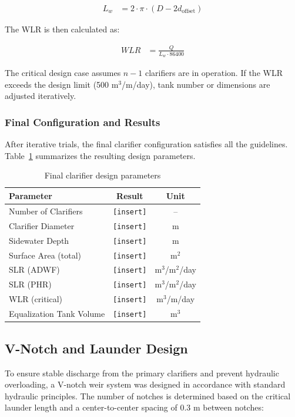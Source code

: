 \documentclass[12pt]{article}
\begin{document}
\begin{align}
L_w &= 2 \cdot \pi \cdot (D - 2d_{\text{offset}})
\end{align}

The WLR is then calculated as:

\begin{align}
WLR &= \frac{Q}{L_w \cdot 86400}
\end{align}

The critical design case assumes \(n-1\) clarifiers are in operation. If the WLR exceeds the design limit (500 m$^3$/m/day), tank number or dimensions are adjusted iteratively.

\subsubsection{Final Configuration and Results}

After iterative trials, the final clarifier configuration satisfies all the guidelines. Table~\ref{tab:clarifier_results} summarizes the resulting design parameters.

\begin{table}[h]
\centering
\caption{Final clarifier design parameters}
\label{tab:clarifier_results}
\begin{tabular}{|l|c|c|}
\hline
\textbf{Parameter} & \textbf{Result} & \textbf{Unit} \\
\hline
Number of Clarifiers & \texttt{[insert]} & -- \\
Clarifier Diameter & \texttt{[insert]} & m \\
Sidewater Depth & \texttt{[insert]} & m \\
Surface Area (total) & \texttt{[insert]} & m$^2$ \\
SLR (ADWF) & \texttt{[insert]} & m$^3$/m$^2$/day \\
SLR (PHR) & \texttt{[insert]} & m$^3$/m$^2$/day \\
WLR (critical) & \texttt{[insert]} & m$^3$/m/day \\
Equalization Tank Volume & \texttt{[insert]} & m$^3$ \\
\hline
\end{tabular}
\end{table}

\subsection{V-Notch and Launder Design}
\label{sec:vnotch_design}

To ensure stable discharge from the primary clarifiers and prevent hydraulic overloading, a V-notch weir system was designed in accordance with standard hydraulic principles. The number of notches is determined based on the critical launder length and a center-to-center spacing of 0.3 m between notches:
\end{document}
